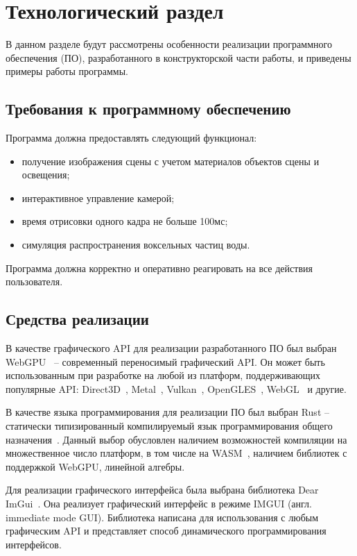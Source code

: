 \chapter{Технологический раздел}

В данном разделе будут рассмотрены особенности реализации программного обеспечения (ПО),
разработанного в конструкторской части работы, и приведены примеры работы программы.

\section{Требования к программному обеспечению}

Программа должна предоставлять следующий функционал:
\begin{itemize}
    \item получение изображения сцены с учетом материалов объектов сцены и освещения;
    \item интерактивное управление камерой;
    \item время отрисовки одного кадра не больше 100мс;
    \item симуляция распространения воксельных частиц воды.
\end{itemize}

Программа должна корректно и оперативно реагировать на все действия пользователя.

\section{Средства реализации}

В качестве графического API для реализации разработанного ПО 
был выбран WebGPU~\cite{WebGPU} -- современный переносимый графический
API.
Он может быть использованным при разработке на любой из платформ, 
поддерживающих популярные API: Direct3D~\cite{DirectX12}, 
Metal~\cite{Metal}, Vulkan~\cite{Vulkan}, OpenGLES~\cite{OpenGLES}, WebGL~\cite{WebGL} и другие.

В качестве языка программирования для реализации ПО был выбран Rust -- 
статически типизированный компилируемый язык программирования общего назначения~\cite{Rust}.
Данный выбор обусловлен наличием возможностей 
компиляции на множественное число платформ, в том числе на WASM~\cite{WASM}, наличием
библиотек с поддержкой WebGPU, линейной алгебры.

Для реализации графического интерфейса была выбрана библиотека Dear ImGui~\cite{ImGui}.
Она реализует графический интерфейс в режиме IMGUI (англ. immediate mode GUI). Библиотека написана 
для использования с любым графическим API и представляет способ динамического 
программирования интерфейсов.

